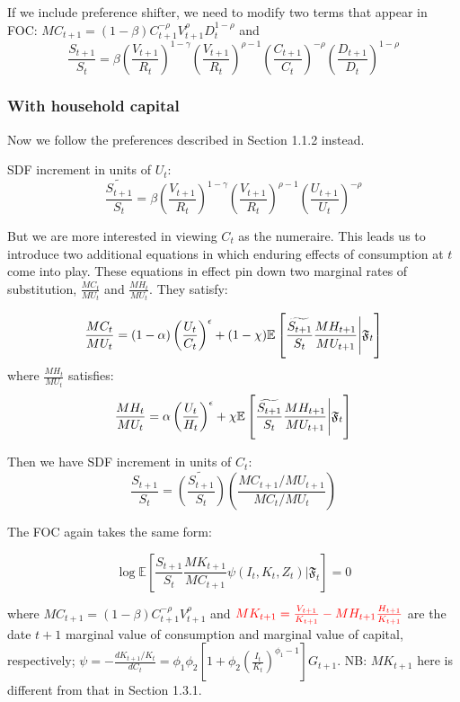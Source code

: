 \documentclass{article}
\theoremstyle{exampstyle}
\begin{document}
If we include preference shifter, we need to modify two terms that appear in FOC: $MC_{t+1} = (1-\beta)C_{t+1}^{-\rho}V_{t+1}^\rho D_t^{1-\rho}$ and 
\begin{equation*}
\frac{S_{t+1}}{S_t} = \beta \left(\frac{V_{t+1}}{R_t}\right)^{1-\gamma} \left(\frac{V_{t+1}}{R_t}\right)^{\rho-1} \left(\frac{C_{t+1}}{C_t}\right)^{-\rho} \left(\frac{D_{t+1}}{D_t}\right)^{1-\rho}
\end{equation*} 



\subsubsection{With household capital}
Now we follow the preferences described in Section 1.1.2 instead.

SDF increment in units of $U_t$:
\begin{equation*}
\widetilde{\frac{S_{t+1}}{S_t}} = \beta \left(\frac{V_{t+1}}{R_t}\right)^{1-\gamma} \left(\frac{V_{t+1}}{R_t}\right)^{\rho-1} \left(\frac{U_{t+1}}{U_t}\right)^{-\rho}
\end{equation*} 

But we are more interested in viewing $C_t$ as the numeraire. This leads us to introduce two additional equations in which enduring effects of consumption at $t$ come into play. These equations in effect pin down two marginal rates of substitution, $\frac{MC_t}{MU_t}$ and $\frac{MH_t}{MU_t}$. They satisfy: 


\begin{equation}\notag
\frac{MC_t}{MU_t} = (1-\alpha)\left( \frac{U_t}{C_t} \right)^\epsilon + (1-\chi) \mathbb{E}\left[\widetilde{\frac{S_{t+1}}{S_t}}\frac{MH_{t+1}}{MU_{t+1}} \Biggl| {\mathfrak F}_t\right] 
\end{equation}
where $\frac{MH_t}{MU_t}$ satisfies:
\begin{equation}\notag
\frac{MH_t}{MU_t} = \alpha\left( \frac{U_t}{H_t} \right)^\epsilon + \chi \mathbb{E}\left[\widetilde{\frac{S_{t+1}}{S_t}}\frac{MH_{t+1}}{MU_{t+1}} \Biggl| {\mathfrak F}_t \right] 
\end{equation}

Then we have SDF increment in units of $C_t$:
\begin{equation*}
\frac{S_{t+1}}{S_t} = \widetilde{\left(\frac{S_{t+1}}{S_t}\right)}\left(\frac{{MC_{t+1}}/{MU_{t+1}}}{{MC_t}/{MU_t}}\right)
\end{equation*}

The FOC again takes the same form:

\begin{equation}
\log \mathbb{E}\left[\frac{S_{t+1}}{S_t}\frac{MK_{t+1}}{MC_{t+1}}\psi \left(I_t, K_t, Z_t\right) \Biggl| {\mathfrak F}_t \right] = 0 \tag{9}
\end{equation}

where $MC_{t+1} = (1-\beta)C_{t+1}^{-\rho}V_{t+1}^\rho$ and $\color{red}{MK_{t+1} = \frac{V_{t+1}}{K_{t+1}} - MH_{t+1}\frac{H_{t+1}}{K_{t+1}}}$ are the date $t+1$ marginal value of consumption and marginal value of capital, respectively; $\psi = - \frac{dK_{t+1}/K_t}{dC_t} = \phi_1 \phi_2 [1+\phi_2 (\frac{I_t}{K_t})^{\phi_1-1}]G_{t+1}$. NB: $MK_{t+1}$ here is different from that in Section 1.3.1.
\end{document}
